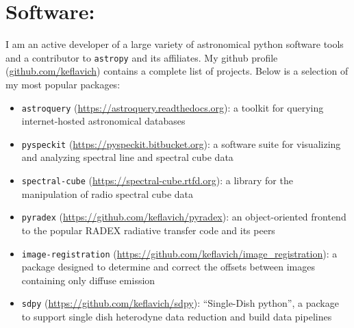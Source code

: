 \section*{Software:}
\vspace{-10pt}
I am an active developer of a large variety of astronomical python software
tools and a contributor to \texttt{astropy} and its affiliates.  My github
profile (\url{github.com/keflavich}) contains a complete list of projects.
Below is a selection of my most popular packages:

\begin{itemize}
\itemsep-3pt
    \item \texttt{astroquery} (\url{https://astroquery.readthedocs.org}):
        a toolkit for querying internet-hosted astronomical databases
    \item \texttt{pyspeckit} (\url{https://pyspeckit.bitbucket.org}): a software suite
        for visualizing and analyzing spectral line and spectral cube
        data
    \item \texttt{spectral-cube} (\url{https://spectral-cube.rtfd.org}): a library for the manipulation
        of radio spectral cube data
    \item \texttt{pyradex} (\url{https://github.com/keflavich/pyradex}):
        an object-oriented frontend to the popular RADEX radiative transfer code and
        its peers
    \item \texttt{image-registration} (\url{https://github.com/keflavich/image_registration}):
        a package designed to determine and correct the offsets between images containing only
        diffuse emission
    \item \texttt{sdpy} (\url{https://github.com/keflavich/sdpy}):
        ``Single-Dish python'', a package to support single dish heterodyne data
        reduction and build data pipelines
\end{itemize}

